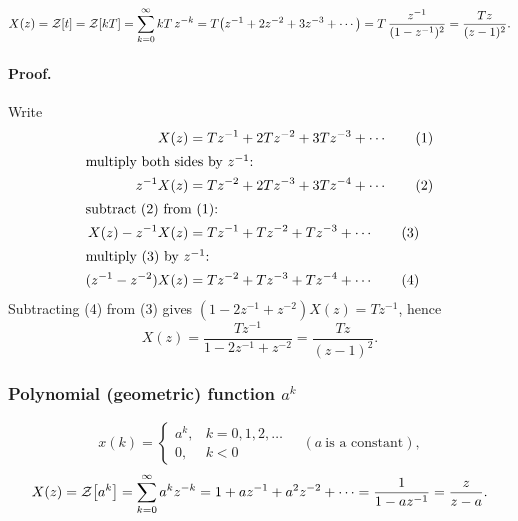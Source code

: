\begin{center}
\hfill
{}
\end{center}

\begin{equation}
  X(z)=\mathcal{Z}\!\left[t\right]=\mathcal{Z}\!\left[kT\right]=\sum_{k=0}^{\infty}kT\,z^{-k}=T\bigl(z^{-1}+2z^{-2}+3z^{-3}+\cdots\bigr)
  =T\,\frac{z^{-1}}{(1-z^{-1})^{2}}=\frac{Tz}{(z-1)^{2}}.
\end{equation}

\paragraph{Proof.} Write
\begin{align}
  X(z)&=Tz^{-1}+2Tz^{-2}+3Tz^{-3}+\cdots \tag{1}\\
  \intertext{multiply both sides by $z^{-1}$:}
  z^{-1}X(z)&=Tz^{-2}+2Tz^{-3}+3Tz^{-4}+\cdots \tag{2}\\
  \intertext{subtract (2) from (1):}
  X(z)-z^{-1}X(z)&=Tz^{-1}+Tz^{-2}+Tz^{-3}+\cdots \tag{3}\\
  \intertext{multiply (3) by $z^{-1}$:}
  (z^{-1}-z^{-2})X(z)&=Tz^{-2}+Tz^{-3}+Tz^{-4}+\cdots \tag{4}
\end{align}
Subtracting (4) from (3) gives $(1-2z^{-1}+z^{-2})X(z)=Tz^{-1}$, hence
\[
  X(z)=\frac{Tz^{-1}}{1-2z^{-1}+z^{-2}}=\frac{Tz}{(z-1)^{2}}.
\]

\subsubsection*{Polynomial (geometric) function $a^{k}$}
\[
  x(k)=\begin{cases}a^{k},&k=0,1,2,\dots\\0,&k<0\end{cases}\quad(a\ \text{is a constant}),
\]
\begin{equation}
  X(z)=\mathcal{Z}\!\left[a^{k}\right]=\sum_{k=0}^{\infty}a^{k}z^{-k}=1+az^{-1}+a^{2}z^{-2}+\cdots=\frac{1}{1-az^{-1}}=\frac{z}{z-a}.
\end{equation}

